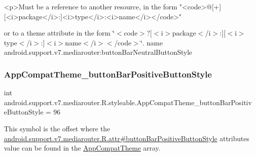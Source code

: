 \begin{DoxyVerb}      <p>Must be a reference to another resource, in the form "<code>@[+][<i>package</i>:]<i>type</i>:<i>name</i></code>"
\end{DoxyVerb}
 or to a theme attribute in the form \char`\"{}$<$code$>$?\mbox{[}$<$i$>$package$<$/i$>$\+:\mbox{]}\mbox{[}$<$i$>$type$<$/i$>$\+:\mbox{]}$<$i$>$name$<$/i$>$$<$/code$>$\char`\"{}.  name android.\+support.\+v7.\+mediarouter\+:button\+Bar\+Neutral\+Button\+Style \mbox{\label{classandroid_1_1support_1_1v7_1_1mediarouter_1_1R_1_1styleable_a43d9a32374dba702819c4ec6c05ab691}} 
\subsubsection{\texorpdfstring{App\+Compat\+Theme\+\_\+button\+Bar\+Positive\+Button\+Style}{AppCompatTheme\_buttonBarPositiveButtonStyle}}
{\footnotesize\ttfamily int android.\+support.\+v7.\+mediarouter.\+R.\+styleable.\+App\+Compat\+Theme\+\_\+button\+Bar\+Positive\+Button\+Style = 96\hspace{0.3cm}{\ttfamily [static]}}

This symbol is the offset where the \hyperlink{classandroid_1_1support_1_1v7_1_1mediarouter_1_1R_1_1attr_ad2375a05daf039b06d6814c9e5ef3aaf}{android.\+support.\+v7.\+mediarouter.\+R.\+attr\#button\+Bar\+Positive\+Button\+Style} attribute\textquotesingle{}s value can be found in the \hyperlink{classandroid_1_1support_1_1v7_1_1mediarouter_1_1R_1_1styleable_a4e3d3900c75d49aeb2f283cac00214d6}{App\+Compat\+Theme} array.

